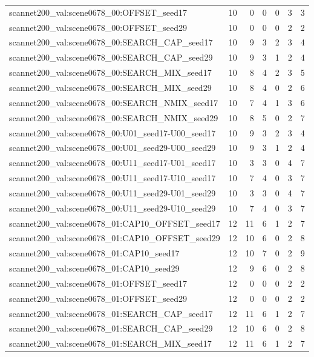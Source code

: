 \begin{table}[t]
\begin{tabular}{lrrrrrr}
scannet200\_val:scene0678\_00:OFFSET\_seed17 & 10 & 0 & 0 & 0 & 3 & 3 \\
scannet200\_val:scene0678\_00:OFFSET\_seed29 & 10 & 0 & 0 & 0 & 2 & 2 \\
scannet200\_val:scene0678\_00:SEARCH\_CAP\_seed17 & 10 & 9 & 3 & 2 & 3 & 4 \\
scannet200\_val:scene0678\_00:SEARCH\_CAP\_seed29 & 10 & 9 & 3 & 1 & 2 & 4 \\
scannet200\_val:scene0678\_00:SEARCH\_MIX\_seed17 & 10 & 8 & 4 & 2 & 3 & 5 \\
scannet200\_val:scene0678\_00:SEARCH\_MIX\_seed29 & 10 & 8 & 4 & 0 & 2 & 6 \\
scannet200\_val:scene0678\_00:SEARCH\_NMIX\_seed17 & 10 & 7 & 4 & 1 & 3 & 6 \\
scannet200\_val:scene0678\_00:SEARCH\_NMIX\_seed29 & 10 & 8 & 5 & 0 & 2 & 7 \\
scannet200\_val:scene0678\_00:U01\_seed17-U00\_seed17 & 10 & 9 & 3 & 2 & 3 & 4 \\
scannet200\_val:scene0678\_00:U01\_seed29-U00\_seed29 & 10 & 9 & 3 & 1 & 2 & 4 \\
scannet200\_val:scene0678\_00:U11\_seed17-U01\_seed17 & 10 & 3 & 3 & 0 & 4 & 7 \\
scannet200\_val:scene0678\_00:U11\_seed17-U10\_seed17 & 10 & 7 & 4 & 0 & 3 & 7 \\
scannet200\_val:scene0678\_00:U11\_seed29-U01\_seed29 & 10 & 3 & 3 & 0 & 4 & 7 \\
scannet200\_val:scene0678\_00:U11\_seed29-U10\_seed29 & 10 & 7 & 4 & 0 & 3 & 7 \\
scannet200\_val:scene0678\_01:CAP10\_OFFSET\_seed17 & 12 & 11 & 6 & 1 & 2 & 7 \\
scannet200\_val:scene0678\_01:CAP10\_OFFSET\_seed29 & 12 & 10 & 6 & 0 & 2 & 8 \\
scannet200\_val:scene0678\_01:CAP10\_seed17 & 12 & 10 & 7 & 0 & 2 & 9 \\
scannet200\_val:scene0678\_01:CAP10\_seed29 & 12 & 9 & 6 & 0 & 2 & 8 \\
scannet200\_val:scene0678\_01:OFFSET\_seed17 & 12 & 0 & 0 & 0 & 2 & 2 \\
scannet200\_val:scene0678\_01:OFFSET\_seed29 & 12 & 0 & 0 & 0 & 2 & 2 \\
scannet200\_val:scene0678\_01:SEARCH\_CAP\_seed17 & 12 & 11 & 6 & 1 & 2 & 7 \\
scannet200\_val:scene0678\_01:SEARCH\_CAP\_seed29 & 12 & 10 & 6 & 0 & 2 & 8 \\
scannet200\_val:scene0678\_01:SEARCH\_MIX\_seed17 & 12 & 11 & 6 & 1 & 2 & 7 \\

\end{tabular}
\end{table}
